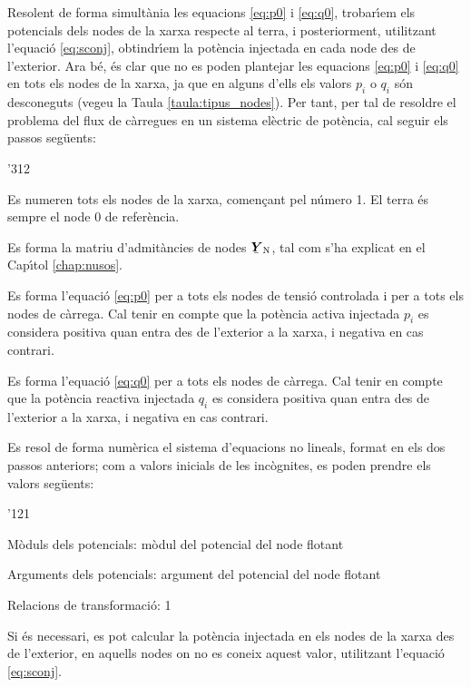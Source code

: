 Resolent de forma simult\`{a}nia les equacions \eqref{eq:p0} i
\eqref{eq:q0}, trobar\'{\i}em els potencials dels nodes de la xarxa
respecte al terra, i posteriorment, utilitzant l'equaci\'{o}
\eqref{eq:sconj}, obtindr\'{\i}em la pot\`{e}ncia injectada en cada node des
de l'exterior. Ara b\'{e}, \'{e}s clar que no es poden plantejar les
equacions \eqref{eq:p0} i \eqref{eq:q0} en tots els nodes de la
xarxa, ja que en alguns d'ells els valors $p_i$ o $q_i$ s\'{o}n
desconeguts (vegeu la Taula \vref{taula:tipus_nodes}). Per tant, per
tal de resoldre el problema del flux de c\`{a}rregues en un sistema
el\`{e}ctric de pot\`{e}ncia, cal seguir els passos seg\"{u}ents:
\begin{dingautolist}{'312}
    \item Es numeren tots els nodes de la xarxa, comen\c{c}ant pel n\'{u}mero 1. El terra \'{e}s sempre el node 0 de refer\`{e}ncia.
   \item Es forma la matriu d'admit\`{a}ncies de nodes $\mcmplx{Y}\ped{N}$, tal com s'ha
   explicat en el Cap\'{\i}tol \ref{chap:nusos}.
   \item Es forma l'equaci\'{o} \eqref{eq:p0} per a tots els nodes de tensi\'{o} controlada i per
   a tots els nodes de c\`{a}rrega. Cal tenir en compte que la pot\`{e}ncia activa  injectada $p_i$ es considera
   positiva quan entra des de l'exterior a la xarxa, i negativa en cas contrari.
   \item Es forma l'equaci\'{o} \eqref{eq:q0} per a tots els nodes de c\`{a}rrega. Cal tenir en compte
   que la pot\`{e}ncia reactiva injectada $q_i$  es considera positiva quan entra des de l'exterior a la xarxa, i negativa en cas contrari.
   \item Es resol de forma num\`{e}rica el sistema d'equacions no lineals, format en els dos
   passos anteriors; com a valors inicials de les inc\`{o}gnites, es poden prendre els valors
   seg\"{u}ents:
   \begin{dinglist}{'121}
    \item M\`{o}duls dels potencials: m\`{o}dul del potencial del node flotant
    \item Arguments dels potencials: argument del potencial del node flotant
    \item Relacions de transformaci\'{o}: 1
   \end{dinglist}
   \item Si \'{e}s necessari,  es pot calcular la pot\`{e}ncia injectada en els nodes de la xarxa
   des de l'exterior, en aquells nodes on no es
   coneix aquest valor, utilitzant    l'equaci\'{o} \eqref{eq:sconj}.
\end{dingautolist}

